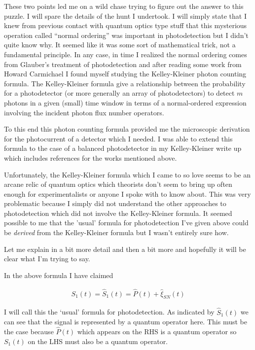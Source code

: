 \documentclass[12pt]{article}
\begin{document}
These two points led me on a wild chase trying to figure out the answer to this puzzle. I will spare the details of the hunt I undertook. I will simply state that I knew from previous contact with quantum optics type stuff that this mysterious operation called ``normal ordering'' was important in photodetection but I didn't quite know why. It seemed like it was some sort of mathematical trick, not a fundamental principle. In any case, in time I realized the normal ordering comes from Glauber's treatment of photodetection and after reading some work from Howard Carmichael I found myself studying the Kelley-Kleiner photon counting formula. The Kelley-Kleiner formula give a relationship between the probability for a photodetector (or more generally an array of photodetectors) to detect $m$ photons in a given (small) time window in terms of a normal-ordered expression involving the incident photon flux number operators.

To this end this photon counting formula provided me the microscopic derivation for the photocurrent of a detector which I needed. I was able to extend this formula to the case of a balanced photodetector in my Kelley-Kleiner write up which includes references for the works mentioned above.

Unfortunately, the Kelley-Kleiner formula which I came to so love seems to be an arcane relic of quantum optics which theorists don't seem to bring up often enough for experimentalists or anyone I spoke with to know about. This was very problematic because I simply did not understand the other approaches to photodetection which did not involve the Kelley-Kleiner formula. It seemed possible to me that the 'usual' formula for photodetection I've given above could be \textit{derived} from the Kelley-Kleiner formula but I wasn't entirely sure how.

Let me explain in a bit more detail and then a bit more and hopefully it will be clear what I'm trying to say.

In the above formula I have claimed

\begin{align}
S_1(t) = \hat{S}_1(t) = \hat{P}(t) + \hat{\xi}_{SN}(t)
\end{align}

I will call this the `usual' formula for photodetection. As indicated by $\hat{S}_1(t)$ we can see that the signal is represented by a quantum operator here. This must be the case because $\hat{P}(t)$ which appears on the RHS is a quantum operator so $S_1(t)$ on the LHS must also be a quantum operator.
\end{document}
